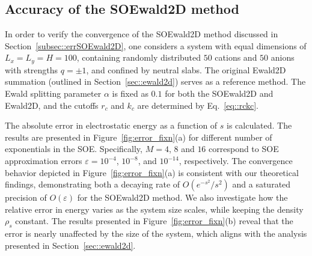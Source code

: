 \subsection{Accuracy of the SOEwald2D method}\label{subsec::errSOE}

In order to verify the convergence of the SOEwald2D method discussed in Section~\ref{subsec::errSOEwald2D}, one considers a system with equal dimensions of $L_x=L_y=H=100$, containing randomly distributed $50$ cations and $50$ anions with strengths $q=\pm 1$,  and confined by neutral slabs. 
The original Ewald2D summation (outlined in Section~\ref{sec::ewald2d}) serves as a reference method.
The Ewald splitting parameter $\alpha$ is fixed as $0.1$ for both the SOEwald2D and Ewald2D, and the cutoffs $r_c$ and $k_c$ are determined by Eq.~\eqref{eq::rckc}. 

The absolute error in electrostatic energy as a function of $s$ is calculated. 
The results are presented in Figure~\ref{fig:error_fixn}(a) for different number of exponentials in the SOE. 
Specifically, $M=4$, $8$ and $16$ correspond to SOE approximation errors $\varepsilon =10^{-4}$, $10^{-8}$, and $10^{-14}$, respectively. 
The convergence behavior depicted in Figure~\ref{fig:error_fixn}(a) is consistent with our theoretical findings, demonstrating both a decaying rate of $O(e^{-s^2}/s^2)$ and a saturated precision of $O(\varepsilon)$ for the SOEwald2D method. 
We also investigate how the relative error in energy varies as the system size scales, while keeping the density $\rho_{s}$ constant. 
The results presented in Figure~\ref{fig:error_fixn}(b) reveal that the error is nearly unaffected by the size of the system, which aligns with the analysis presented in Section~\ref{sec::ewald2d}.


